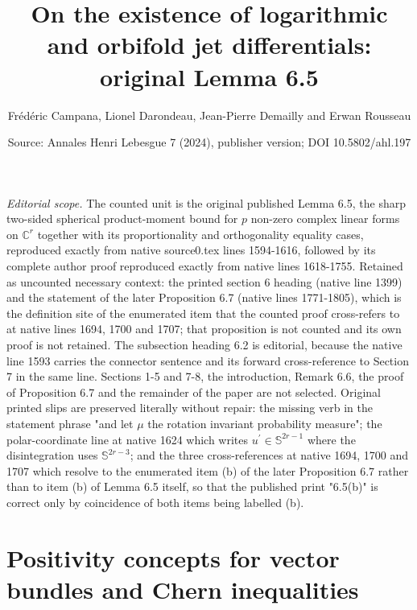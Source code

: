 \documentclass[10pt,a4paper]{amsart}
\title[Chern form inequalities]{On the existence of logarithmic and orbifold jet differentials: original Lemma 6.5}
\author{Fr\'ed\'eric Campana, Lionel Darondeau, Jean-Pierre Demailly and Erwan Rousseau}
\date{Source: Annales Henri Lebesgue 7 (2024), publisher version; DOI 10.5802/ahl.197}
\numberwithin{equation}{section}
\newcommand*\bC{\mathbb{C}}
\newcommand*\bS{\mathbb{S}}
\theoremstyle{definition}\newtheorem{defi}[theo]{Definition}
\theoremstyle{remark}\newtheorem{rema}[theo]{Remark}
\begin{document}
\maketitle
\noindent\textit{Editorial scope.} The counted unit is the original published Lemma 6.5, the sharp two-sided spherical product-moment bound for $p$ non-zero complex linear forms on $\bC^r$ together with its proportionality and orthogonality equality cases, reproduced exactly from native source0.tex lines 1594-1616, followed by its complete author proof reproduced exactly from native lines 1618-1755. Retained as uncounted necessary context: the printed section 6 heading (native line 1399) and the statement of the later Proposition 6.7 (native lines 1771-1805), which is the definition site of the enumerated item that the counted proof cross-refers to at native lines 1694, 1700 and 1707; that proposition is not counted and its own proof is not retained. The subsection heading 6.2 is editorial, because the native line 1593 carries the connector sentence and its forward cross-reference to Section 7 in the same line. Sections 1-5 and 7-8, the introduction, Remark 6.6, the proof of Proposition 6.7 and the remainder of the paper are not selected. Original printed slips are preserved literally without repair: the missing verb in the statement phrase "and let $\mu$ the rotation invariant probability measure"; the polar-coordinate line at native 1624 which writes $u^\prime\in\bS^{2r-1}$ where the disintegration uses $\bS^{2r-3}$; and the three cross-references at native 1694, 1700 and 1707 which resolve to the enumerated item (b) of the later Proposition 6.7 rather than to item (b) of Lemma 6.5 itself, so that the published print "6.5(b)" is correct only by coincidence of both items being labelled (b).
\setcounter{section}{5}
\section{Positivity concepts for vector bundles and Chern inequalities}\label{se:Chern_inequalities}

\setcounter{subsection}{1}
\end{document}
